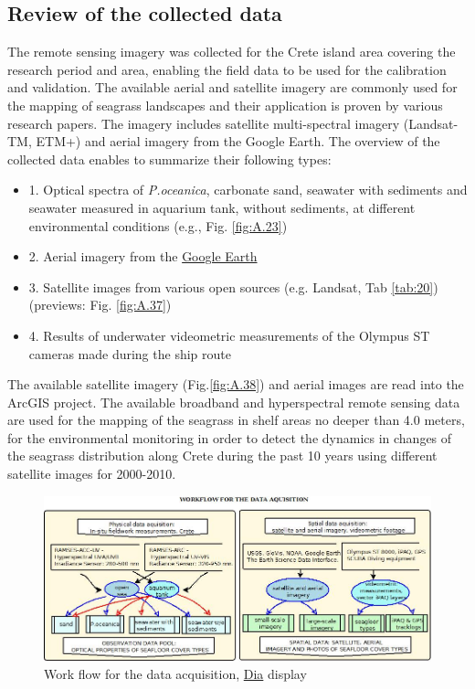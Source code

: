 \documentclass[11pt]{article}
\begin{document}
\subsection{Review of the collected data}
The remote sensing imagery was collected for the Crete island area covering the research period and
area, enabling the field data to be used for the calibration and validation. The available aerial and
satellite imagery are commonly used for the mapping of seagrass landscapes and their application is
proven by various research papers. The imagery includes satellite multi-spectral imagery (Landsat-TM,
ETM+) and aerial imagery from the Google Earth.
The overview of the collected data enables to summarize their following types:
\begin{itemize}
	\item[] 1. Optical spectra of \textit{P.oceanica}, carbonate sand, seawater with sediments and seawater measured in aquarium tank, without sediments, at different environmental conditions (e.g., Fig. \ref{fig:A.23})
	\item[]2. Aerial imagery from the \href{http://www.google.com/earth/index.html}{Google Earth}
	\item[]3. Satellite images from various open sources (e.g. Landsat, Tab \ref{tab:20}) (previews: Fig. \ref{fig:A.37})
	\item[]4. Results of underwater videometric measurements of the \ac{Olympus ST} cameras made during the ship route
\end{itemize}
The available satellite imagery (Fig.\ref{fig:A.38}) and aerial images are read into the ArcGIS project.
The available broadband and hyperspectral remote sensing data are used for the mapping of the
seagrass in shelf areas no deeper than 4.0 meters, for the environmental monitoring in order to detect
the dynamics in changes of the seagrass distribution along Crete during the past 10 years using
different satellite images for 2000-2010.

\begin{figure}[h]
	\centering
	\includegraphics[scale=0.40]{UML_Dia.jpg}
	\caption{Work flow for the data acquisition, \href{http://live.gnome.org/Dia}{Dia} display}
	\label{fig:24}
\end{figure}
\end{document}
